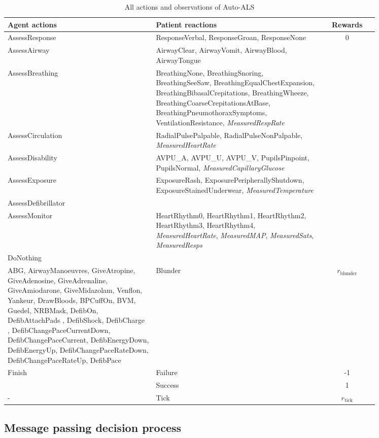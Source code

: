 \begin{table}[H]
\begin{tabular}{|p{0.4\linewidth}|p{0.45\linewidth}|c|}
\toprule
Agent actions &
  Patient reactions & Rewards
   \\
   \midrule
AssessResponse &
  ResponseVerbal,     ResponseGroan,     ResponseNone &
  \multirow{9}{*}{0} \\
AssessAirway &
  AirwayClear,     AirwayVomit,     AirwayBlood,     AirwayTongue &
   \\
AssessBreathing &
  BreathingNone,     BreathingSnoring,     BreathingSeeSaw,     BreathingEqualChestExpansion,     BreathingBibasalCrepitations,     BreathingWheeze,     BreathingCoarseCrepitationsAtBase,     BreathingPneumothoraxSymptoms,  VentilationResistance, \emph{MeasuredRespRate} &
   \\
AssessCirculation &
  RadialPulsePalpable,     RadialPulseNonPalpable, \emph{MeasuredHeartRate} &
   \\
AssessDisability &
  AVPU\_A,     AVPU\_U,     AVPU\_V, PupilsPinpoint,     PupilsNormal, \emph{MeasuredCapillaryGlucose} &
   \\
AssessExposure &
  ExposureRash,     ExposurePeripherallyShutdown,     ExposureStainedUnderwear, \emph{MeasuredTemperature} &
   \\
AssessDefibrillator &
   &
   \\
AssessMonitor &
  HeartRhythm0,     HeartRhythm1,     HeartRhythm2,     HeartRhythm3,     HeartRhythm4, \emph{MeasuredHeartRate}, \emph{MeasuredMAP}, \emph{MeasuredSats}, \emph{MeasuredResps} &
   \\
   DoNothing & & \\
   \midrule
ABG,     AirwayManoeuvres,     GiveAtropine,     GiveAdenosine,     GiveAdrenaline,     GiveAmiodarone,     GiveMidazolam,     Venflon,     Yankeur,     DrawBloods,     BPCuffOn,     BVM,     Guedel,     NRBMask,     DefibOn,     DefibAttachPads ,     DefibShock,     DefibCharge ,     DefibChangePaceCurrentDown,     DefibChangePaceCurrent,     DefibEnergyDown,     DefibEnergyUp,     DefibChangePaceRateDown,     DefibChangePaceRateUp,     DefibPace& 
   Blunder & $r_\text{blunder}$
   \\
   \midrule
   \multirow{2}{*}{Finish} & Failure & -1 \\
   & Success & 1 \\
   \midrule
   - & Tick & $r_\text{tick}$ \\
  \bottomrule
\end{tabular}
\caption{All actions and observations of Auto-ALS}
\label{tab:auto-als}
\end{table}

\subsection{Message passing decision process}